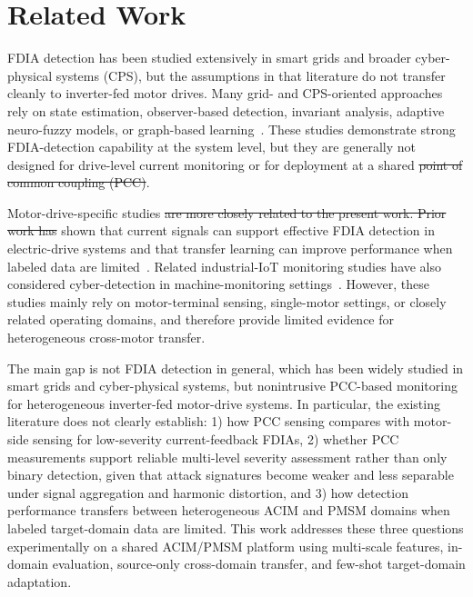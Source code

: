 \documentclass[letterpaper,journal]{IEEEtran}
\providecommand{\DIFadd}[1]{{\protect\color{blue}\uwave{#1}}} %
\providecommand{\DIFdel}[1]{{\protect\color{red}\sout{#1}}}                      %
\providecommand{\DIFaddbegin}{} %
\providecommand{\DIFaddend}{} %
\providecommand{\DIFdelbegin}{} %
\providecommand{\DIFdelend}{} %
\begin{document}
\section{Related Work}
\label{sec:relatedWorks}

FDIA detection has been studied extensively in smart grids and broader cyber-physical systems (CPS), but the assumptions in that literature do not transfer cleanly to inverter-fed motor drives. Many grid- and CPS-oriented approaches rely on state estimation, observer-based detection, invariant analysis, adaptive neuro-fuzzy models, or graph-based learning~\cite{7438916,basati2022fdi,nath2022quickest,beg2017fdia,sargolzaei2020fdia,10016905}. These studies demonstrate strong FDIA-detection capability at the system level, but they are generally not designed for drive-level current monitoring or for deployment at a shared \DIFdelbegin \DIFdel{point of common coupling (PCC)}\DIFdelend \DIFaddbegin \DIFadd{PCC}\DIFaddend .

Motor-drive-specific studies \DIFdelbegin \DIFdel{are more closely related to the present work. Prior work has }\DIFdelend \DIFaddbegin \DIFadd{have }\DIFaddend shown that current signals can support effective FDIA detection in electric-drive systems and that transfer learning can improve performance when labeled data are limited~\cite{Yang2022Fast,Yang2024Enhanced}. Related industrial-IoT monitoring studies have also considered cyber-detection in machine-monitoring settings~\cite{423563247547}. However, these studies mainly rely on motor-terminal sensing, single-motor settings, or closely related operating domains, and therefore provide limited evidence for heterogeneous cross-motor transfer.





The main gap is not FDIA detection in general, which has been widely studied in smart grids and cyber-physical systems, but nonintrusive PCC-based monitoring for heterogeneous inverter-fed motor-drive systems. In particular, the existing literature does not clearly establish: 1) how PCC sensing compares with motor-side sensing for low-severity current-feedback FDIAs, 2) whether PCC measurements support reliable multi-level severity assessment rather than only binary detection, given that attack signatures become weaker and less separable under signal aggregation and harmonic distortion, and 3) how detection performance transfers between heterogeneous ACIM and PMSM domains when labeled target-domain data are limited. This work addresses these three questions experimentally on a shared ACIM/PMSM platform using multi-scale features, in-domain evaluation, source-only cross-domain transfer, and few-shot target-domain adaptation.
\end{document}
